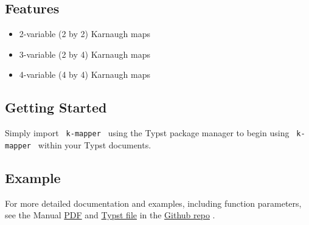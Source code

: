 \subsection{Features}\label{features}

\begin{itemize}
\tightlist
\item
  2-variable (2 by 2) Karnaugh maps
\item
  3-variable (2 by 4) Karnaugh maps
\item
  4-variable (4 by 4) Karnaugh maps
\end{itemize}

\subsection{Getting Started}\label{getting-started}

Simply import \texttt{\ k-mapper\ } using the Typst package manager to
begin using \texttt{\ k-mapper\ } within your Typst documents.

\begin{Shaded}
\begin{Highlighting}[]
\end{Highlighting}
\end{Shaded}

\subsection{Example}\label{example}

\begin{Shaded}
\begin{Highlighting}[]
\NormalTok{    ),}
\NormalTok{  )}
\end{Highlighting}
\end{Shaded}


For more detailed documentation and examples, including function
parameters, see the Manual
\href{https://github.com/derekchai/k-mapper/blob/1f334d9e0f02cc656c01835302474bf728db9f80/manual.pdf}{PDF}
and
\href{https://github.com/derekchai/k-mapper/blob/1f334d9e0f02cc656c01835302474bf728db9f80/manual.typ}{Typst
file} in the
\href{https://github.com/derekchai/typst-karnaugh-map}{Github repo} .

